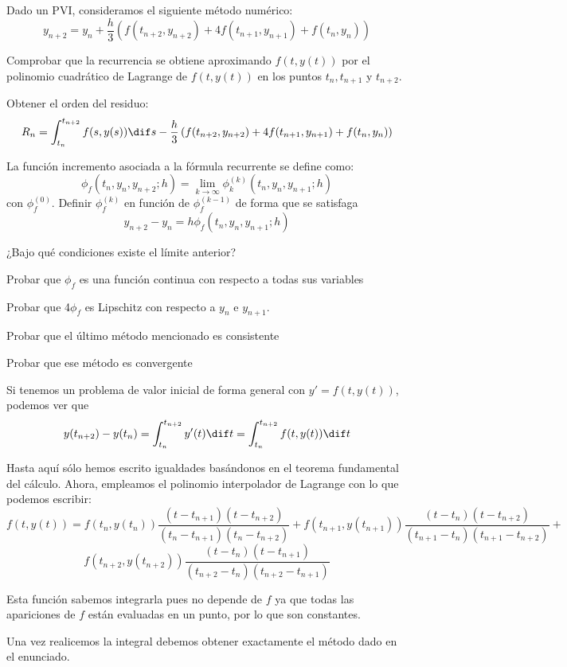 \begin{problem}[4]
Dado un PVI, consideramos el siguiente método numérico:
\[y_{n+2}=y_n+\frac{h}{3}\left(f(t_{n+2},y_{n+2})+4f(t_{n+1},y_{n+1}) + f(t_n,y_n) \right)\]

\ppart Comprobar que la recurrencia se obtiene aproximando $f(t,y(t))$ por el polinomio cuadrático de Lagrange de $f(t,y(t))$ en los puntos $t_n,t_{n+1}$ y $t_{n+2}$.

\ppart Obtener el orden del residuo:
\[R_n = \int_{t_n}^{t_{n+2}}f(s,y(s))\dif s -\frac{h}{3}\left(f(t_{n+2},y_{n+2})+4f(t_{n+1},y_{n+1}) + f(t_n,y_n) \right)\]

\ppart La función incremento asociada a la fórmula recurrente se define como:
\[\phi_f(t_n,y_n,y_{n+2};h) = \lim_{k\to \infty}\phi_k^{(k)}(t_n,y_n,y_{n+1};h)\]
con $\phi_f^{(0)}$. Definir $\phi_f^{(k)}$ en función de $\phi_f^{(k-1)}$ de forma que se satisfaga
\[y_{n+2}-y_n = h \phi_f(t_n,y_n,y_{n+1};h) \]

¿Bajo qué condiciones existe el límite anterior?

\ppart Probar que $\phi_f$ es una función continua con respecto a todas sus variables

\ppart Probar que 4$\phi_f$ es Lipschitz con respecto a $y_n$ e $y_{n+1}$.

\ppart Probar que el último método mencionado es consistente

\ppart Probar que ese método es convergente
\solution

\spart

Si tenemos un problema de valor inicial de forma general con $y'=f(t,y(t))$, podemos ver que
\[y(t_{n+2}) - y(t_n) = \int_{t_n}^{t_{n+2}}y'(t)\dif t =\int_{t_n}^{t_{n+2}}f(t,y(t))\dif t \]

Hasta aquí sólo hemos escrito igualdades basándonos en el teorema fundamental del cálculo. Ahora, empleamos el polinomio interpolador de Lagrange con lo que podemos escribir:
\[f(t,y(t))=f(t_n,y(t_n))\frac{(t-t_{n+1})(t-t_{n+2})}{(t_n-t_{n+1})(t_n-t_{n+2})} + f(t_{n+1},y(t_{n+1}))\frac{(t-t_n)(t-t_{n+2})}{(t_{n+1}-t_n)(t_{n+1}-t_{n+2})} +\]
\[f(t_{n+2},y(t_{n+2})) \frac{(t-t_n)(t-t_{n+1})}{(t_{n+2}-t_n)(t_{n+2}-t_{n+1})}\]

Esta función sabemos integrarla pues no depende de $f$ ya que todas las apariciones de $f$ están evaluadas en un punto, por lo que son constantes.

Una vez realicemos la integral debemos obtener exactamente el método dado en el enunciado.
\end{problem}

